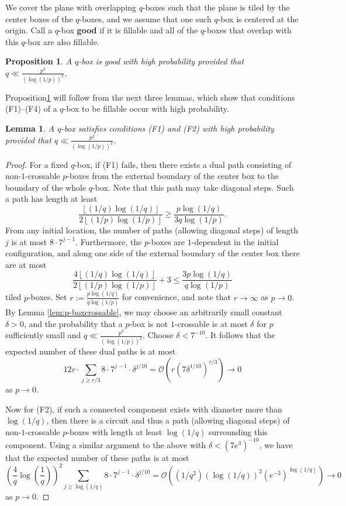 \documentclass{article}
\newcommand{\floor}[1]{\left\lfloor#1\right \rfloor}
\newcommand{\cO}{\mathcal O}
\numberwithin{equation}{section}
\newtheorem{lemma}[theorem]{Lemma}
\newtheorem{prop}[theorem]{Proposition}
\begin{document}
We cover the plane with overlapping $q$-boxes such that the plane is tiled by the center boxes of the $q$-boxes, and we assume that one such $q$-box is centered at the origin.
Call a $q$-box \textbf{good} if it is fillable and all of the $q$-boxes that overlap with this $q$-box are also fillable. 

\begin{prop}\label{prop:q-boxgood}
    A $q$-box is good with high probability provided that $q \ll \frac{p^2}{(\log(1/p))^2}$.
\end{prop}

Proposition\ref{prop:q-boxgood} will follow from the next three lemmas, which show that conditions (F1)--(F4) of a $q$-box to be fillable occur with high probability. 

\begin{lemma}\label{lem:F1F2}
    A $q$-box satisfies conditions (F1) and (F2) with high probability provided that $q \ll \frac{p^2}{(\log(1/p))^2}$.
\end{lemma}
\begin{proof}
    For a fixed $q$-box, if (F1) fails, then there exists a dual path consisting of non-$1$-crossable $p$-boxes from the external boundary of the center box to the boundary of the whole $q$-box.
    Note that this path may take diagonal steps.
    Such a path has length at least 
    \[
    \frac{\floor{(1/q)\log(1/q)}}{2\floor{(1/p)\log(1/p)}} \geq \frac{p\log(1/q)}{3q\log(1/p)}.
    \]
    From any initial location, the number of paths (allowing diagonal steps) of length $j$ is at most $8\cdot 7^{j - 1}$.
    Furthermore, the $p$-boxes are $1$-dependent in the initial configuration, and along one side of the external boundary of the center box there are at most 
    \[
    \frac{4\floor{(1/q)\log(1/q)}}{2\floor{(1/p)\log(1/p)}} + 3 \leq 
    \frac{3p\log(1/q)}{q\log(1/p)}
    \]
    tiled $p$-boxes.
    Set $r := \frac{p\log(1/q)} {q\log(1/p)}$ for convenience, and note that $r \to \infty$ as $p \to 0$.
    By Lemma \ref{lem:p-boxcrossable}, we may choose an arbitrarily small constant $\delta > 0$, and the probability that a $p$-box is not $1$-crossable is at most $\delta$ for $p$ sufficiently small and $q \ll \frac{p^2}{(\log(1/p))^2}$.
    Choose $\delta < 7^{-10}$.
    It follows that the expected number of these dual paths is at most
    \[
    12r \cdot \sum_{j \geq r/3}   
    8\cdot 7^{j - 1} \cdot \delta^{j/10} 
    = \cO(r (7\delta^{1/10})^{r/3})
    \to 0
    \]
    as $p \to 0$.

    Now for (F2), if such a connected component exists with diameter more than $\log(1/q)$, then there is a circuit and thus a path (allowing diagonal steps) of non-$1$-crossable $p$-boxes with length at least $\log(1/q)$ surrounding this component.
    Using a similar argument to the above with $\delta < (7e^3)^{-10}$, we have that the expected number of these paths is at most
    \[
    \left(\frac{4}{q} \log\left(\frac{1}{q}\right)\right)^2 \sum_{j \geq \log (1/q)}  8\cdot 7^{j - 1}\cdot \delta^{j/10} 
    = \cO((1/q^2) (\log(1/q))^2 (e^{-3})^{\log(1/q)}) \to 0
    \]
    as $p \to 0$.
\end{proof}
\end{document}
